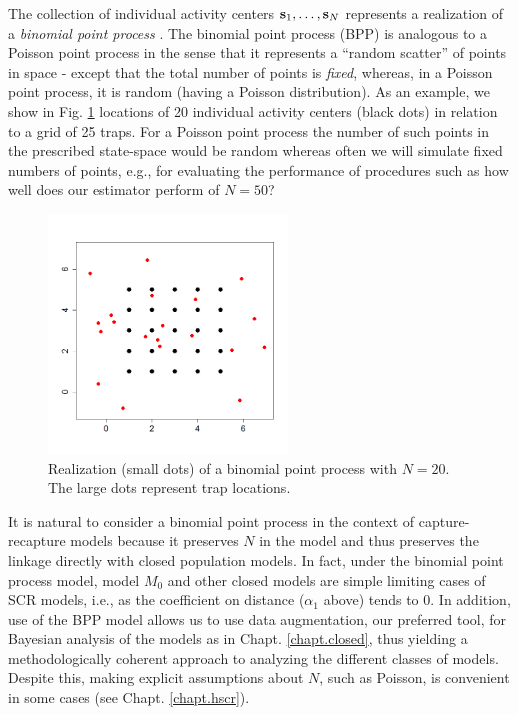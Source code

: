 The collection of individual activity centers ${\bf s}_{1},\ldots,
{\bf s}_{N}$ represents a realization of a {\it binomial point process}
\citep[][p. 61]{illian_etal:2008}.  The binomial point process (BPP)
is analogous to a Poisson point process in the sense that it
represents a ``random scatter'' of points in space - except that the
total number of points is {\it fixed}, whereas, in a Poisson point
process, it is random (having a Poisson distribution).  As an example,
we show in Fig. \ref{scr0.fig.bpp} locations of 20 individual activity
centers (black dots) in relation to a grid of 25 traps. For a Poisson
point process the number of such points in the prescribed state-space
would be random whereas often we will simulate fixed numbers of
points, e.g., for evaluating the performance of procedures such as how
well does our estimator perform of $N=50$?
\begin{figure}[ht]
\begin{center}
\includegraphics[height=2.5in]{Ch4-SCR0/figs/binomialpoint}
\end{center}
\caption{Realization (small dots) of a binomial point process with $N=20$. The
  large dots represent trap locations. 
}
\label{scr0.fig.bpp}
\end{figure}

It is natural to consider a binomial point process in the context of
capture-recapture models because it preserves $N$ in the model and thus
preserves the linkage directly with closed population models. In fact,
under the binomial point process model, model $M_0$ and other closed
models are simple limiting cases of SCR models, i.e., as the
coefficient on distance ($\alpha_1$ above) tends to 0.
In addition, use of
the BPP model allows us to use data augmentation, our preferred tool,  for Bayesian analysis
of the models as in Chapt. \ref{chapt.closed}, thus yielding a methodologically
coherent approach to analyzing the different classes of
models. Despite this, making explicit assumptions about $N$, such as
Poisson, is convenient in some cases (see Chapt. \ref{chapt.hscr}).

